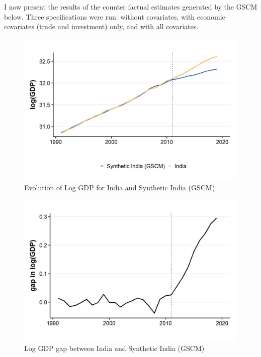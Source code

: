 \documentclass[12pt,nobind, a4paper]{reedthesis}
\begin{document}
 I now present the results of the counter factual estimates generated by the GSCM below. Three specifications were run: without covariates, with economic covariates (trade and investment) only, and with all covariates.
 \begin{figure}

 {\centering \includegraphics[width=1\linewidth]{figure/indiagsynth} 

 }

 \caption{Evolution of Log GDP for India and Synthetic India (GSCM)}\label{fig:indgsyn}
 \end{figure}
 \newpage
 \begin{figure}

 {\centering \includegraphics[width=1\linewidth]{figure/indiagsynthgap} 

 }

 \caption{Log GDP gap between India and Synthetic India (GSCM)}\label{fig:indgsyngap}
 \end{figure}
\end{document}
